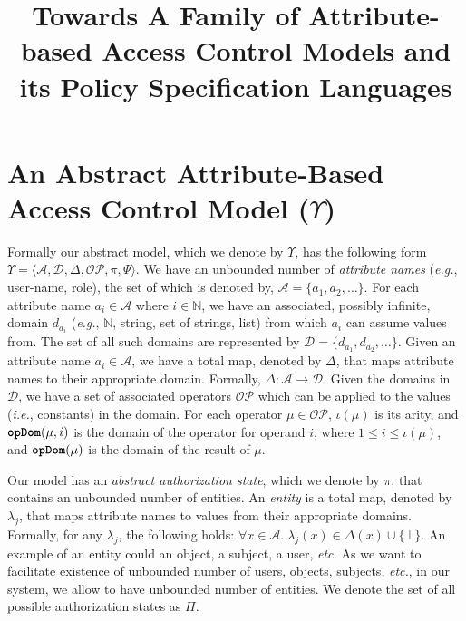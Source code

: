 \documentclass[a4paper,10pt]{article}
\title{Towards A Family of Attribute-based Access Control Models and its Policy Specification Languages}
\author{}
\date{}
\newcommand{\ie}{\textit{i.e.}\xspace}
\newcommand{\eg}{\textit{e.g.}\xspace}
\newcommand{\etc}{\textit{etc.}\xspace}
\newcommand{\state}{\ensuremath{\pi}\xspace}
\newcommand{\stateset}{\ensuremath{\Pi}\xspace}
\newcommand{\policyfunc}{\ensuremath{\Psi}\xspace}
\newcommand{\cD}{\ensuremath{\mathcal{D}}\xspace}
\newcommand{\cA}{\ensuremath{\mathcal{A}}\xspace}
\newcommand{\funcname}[1]{\textbf{\texttt{#1}}}
\newcommand{\dom}{\ensuremath{\Delta}\xspace} %
\newcommand{\domop}{\funcname{opDom}\xspace} %
\newcommand{\OP}{\ensuremath{\mathcal{OP}}\xspace}
\newcommand{\arity}{\ensuremath{\iota}\xspace}
\newcommand{\entity}{\ensuremath{\lambda}\xspace}
\newcommand{\op}{\ensuremath{\mu}\xspace}
\newcommand{\abac}{\ensuremath{\Upsilon}\xspace}
\begin{document}
\maketitle

\begin{abstract}

\end{abstract}

\section{An Abstract Attribute-Based Access Control Model (\abac)}
Formally our abstract model, which we denote by \abac, has the following form 
$\abac=\langle\cA, \cD, \dom, \OP, \state, \policyfunc\rangle$. 
We have an unbounded number of \emph{attribute names} (\eg, user-name, role), the set of which is denoted by, $\cA=\{a_1, a_2,\ldots\}$.  
For each attribute name $a_i\in\cA$ where $i\in\mathbb{N}$, we have an associated, possibly infinite, domain $d_{a_i}$ (\eg, $\mathbb{N}$, 
string, set of strings, list) from which $a_i$ can assume values from. 
The set of all such domains are represented by $\cD=\{d_{a_1}, d_{a_2}, \ldots\}$.  Given an attribute 
name $a_i \in \cA$, we have a total map, denoted by \dom, that maps attribute names to their 
appropriate domain. Formally, $\dom: \cA \rightarrow \cD$. 
Given the domains in \cD, we have a set of associated operators \OP which can be applied 
to the values (\ie, constants) in the domain. 
For each operator $\op \in \OP$, $\arity(\op)$ is its arity, 
and $\domop(\op, i)$ is the domain of the operator for operand $i$, where $1\leq i\leq \arity(\op)$, 
and $\domop(\op)$ is the domain of the result of $\op$.

Our model has an \emph{abstract authorization state}, which we denote by \state, that contains an unbounded number of entities. 
An \emph{entity} is a total map, denoted by $\entity_j$, that maps attribute names to values from their appropriate domains.
Formally, for any $\entity_j$, the following holds: $\forall x \in \cA.\; \entity_j(x) \in \dom(x) \cup \{\bot\}$. 
An example of an entity could an object, a subject, a user, \etc As we want to facilitate existence of unbounded number 
of users, objects, subjects, \etc, in our system, we allow to have unbounded number of entities. 
We denote the set of all possible authorization states as \stateset. 
\end{document}
